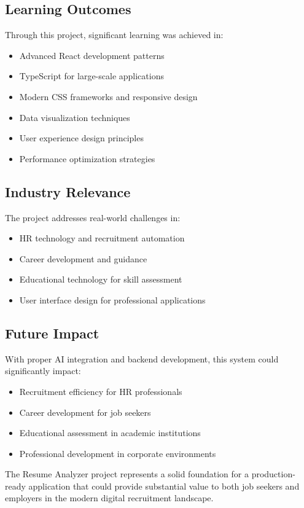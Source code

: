 \documentclass[12pt,a4paper]{article}
\begin{document}
\subsection{Learning Outcomes}
Through this project, significant learning was achieved in:
\begin{itemize}
    \item Advanced React development patterns
    \item TypeScript for large-scale applications
    \item Modern CSS frameworks and responsive design
    \item Data visualization techniques
    \item User experience design principles
    \item Performance optimization strategies
\end{itemize}

\subsection{Industry Relevance}
The project addresses real-world challenges in:
\begin{itemize}
    \item HR technology and recruitment automation
    \item Career development and guidance
    \item Educational technology for skill assessment
    \item User interface design for professional applications
\end{itemize}

\subsection{Future Impact}
With proper AI integration and backend development, this system could significantly impact:
\begin{itemize}
    \item Recruitment efficiency for HR professionals
    \item Career development for job seekers
    \item Educational assessment in academic institutions
    \item Professional development in corporate environments
\end{itemize}

The Resume Analyzer project represents a solid foundation for a production-ready application that could provide substantial value to both job seekers and employers in the modern digital recruitment landscape.
\end{document}
